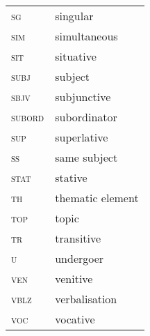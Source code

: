 \begin{multicols}{2}
\begin{tabular}{@{}lp{4cm}}
\textsc{sg} & singular\\
\textsc{sim}&simultaneous\\
\textsc{sit}&situative\\
\textsc{subj} & subject\\
\textsc{sbjv}&subjunctive\\
\textsc{subord}&subordinator\\
\textsc{sup} & superlative\\
\textsc{ss}&same subject\\
\textsc{stat}&stative\\
\textsc{th}&thematic element\\
\textsc{top}&topic\\
\textsc{tr}&transitive\\
\textsc{u}&undergoer\\
\textsc{ven}&venitive\\
\textsc{vblz}&verbalisation\\
\textsc{voc}&vocative\\
\end{tabular}
\end{multicols}
